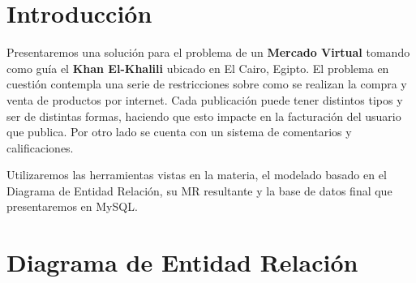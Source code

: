 \documentclass[a4paper, 10pt, twoside]{article}
\begin{document}
\newpage




\section{Introducción}

Presentaremos una soluci\'on para el problema de un \textbf{Mercado Virtual} tomando como gu\'ia el \textbf{Khan El-Khalili} ubicado en El Cairo, Egipto. El problema en cuesti\'on contempla una serie de restricciones sobre como se realizan la compra y venta de productos por internet. Cada publicaci\'on puede tener distintos tipos y ser de distintas formas, haciendo que esto impacte en la facturaci\'on del usuario que publica. Por otro lado se cuenta con un sistema de comentarios y calificaciones.

Utilizaremos las herramientas vistas en la materia, el modelado basado en el Diagrama de Entidad Relaci\'on, su MR resultante y la base de datos final que presentaremos en MySQL.



\section{Diagrama de Entidad Relación}
\end{document}
